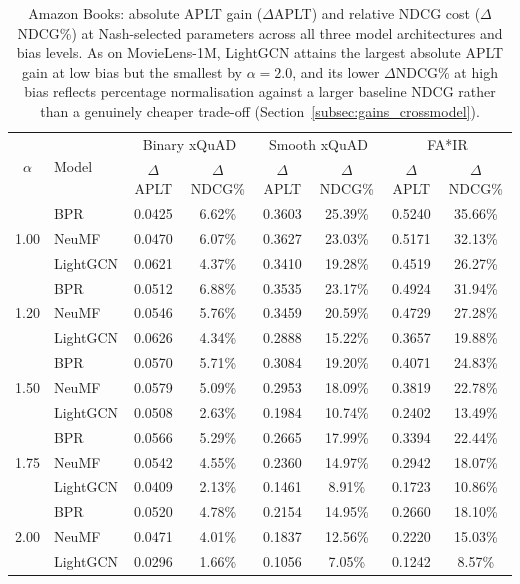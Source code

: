 \begin{table}[htbp]
\centering
\small
\caption{Amazon Books: absolute APLT gain ($\Delta$APLT) and relative NDCG cost ($\Delta$NDCG\%) at Nash-selected parameters across all three model architectures and bias levels. As on MovieLens-1M, LightGCN attains the largest absolute APLT gain at low bias but the smallest by $\alpha=2.0$, and its lower $\Delta$NDCG\% at high bias reflects percentage normalisation against a larger baseline NDCG rather than a genuinely cheaper trade-off (Section~\ref{subsec:gains_crossmodel}).}
\label{tab:crossarch_gains_ab}
\begin{tabular}{clcccccc}
\toprule
\multirow{2}{*}{$\alpha$} & \multirow{2}{*}{Model} & \multicolumn{2}{c}{Binary xQuAD} & \multicolumn{2}{c}{Smooth xQuAD} & \multicolumn{2}{c}{FA*IR} \\
 & & $\Delta$APLT & $\Delta$NDCG\% & $\Delta$APLT & $\Delta$NDCG\% & $\Delta$APLT & $\Delta$NDCG\% \\
\midrule
\multirow{3}{*}{1.00}
 & BPR & 0.0425 & 6.62\% & 0.3603 & 25.39\% & 0.5240 & 35.66\% \\
 \rowcolor{gray!6} & NeuMF & 0.0470 & 6.07\% & 0.3627 & 23.03\% & 0.5171 & 32.13\% \\
 & LightGCN & 0.0621 & 4.37\% & 0.3410 & 19.28\% & 0.4519 & 26.27\% \\
\midrule
\multirow{3}{*}{1.20}
 & BPR & 0.0512 & 6.88\% & 0.3535 & 23.17\% & 0.4924 & 31.94\% \\
 \rowcolor{gray!6} & NeuMF & 0.0546 & 5.76\% & 0.3459 & 20.59\% & 0.4729 & 27.28\% \\
 & LightGCN & 0.0626 & 4.34\% & 0.2888 & 15.22\% & 0.3657 & 19.88\% \\
\midrule
\multirow{3}{*}{1.50}
 & BPR & 0.0570 & 5.71\% & 0.3084 & 19.20\% & 0.4071 & 24.83\% \\
 \rowcolor{gray!6} & NeuMF & 0.0579 & 5.09\% & 0.2953 & 18.09\% & 0.3819 & 22.78\% \\
 & LightGCN & 0.0508 & 2.63\% & 0.1984 & 10.74\% & 0.2402 & 13.49\% \\
\midrule
\multirow{3}{*}{1.75}
 & BPR & 0.0566 & 5.29\% & 0.2665 & 17.99\% & 0.3394 & 22.44\% \\
 \rowcolor{gray!6} & NeuMF & 0.0542 & 4.55\% & 0.2360 & 14.97\% & 0.2942 & 18.07\% \\
 & LightGCN & 0.0409 & 2.13\% & 0.1461 & 8.91\% & 0.1723 & 10.86\% \\
\midrule
\multirow{3}{*}{2.00}
 & BPR & 0.0520 & 4.78\% & 0.2154 & 14.95\% & 0.2660 & 18.10\% \\
 \rowcolor{gray!6} & NeuMF & 0.0471 & 4.01\% & 0.1837 & 12.56\% & 0.2220 & 15.03\% \\
 & LightGCN & 0.0296 & 1.66\% & 0.1056 & 7.05\% & 0.1242 & 8.57\% \\
\bottomrule
\end{tabular}
\end{table}